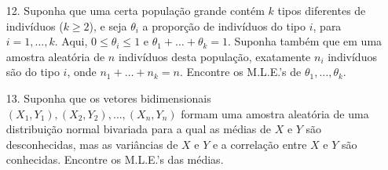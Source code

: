 \begin{enumerate}
    \item[12.] Suponha que uma certa população grande contém $k$ tipos diferentes de indivíduos ($k \ge 2$), e seja $\theta_i$ a proporção de indivíduos do tipo $i$, para $i=1, \dots, k$. Aqui, $0 \le \theta_i \le 1$ e $\theta_1 + \dots + \theta_k = 1$. Suponha também que em uma amostra aleatória de $n$ indivíduos desta população, exatamente $n_i$ indivíduos são do tipo $i$, onde $n_1 + \dots + n_k = n$. Encontre os M.L.E.'s de $\theta_1, \dots, \theta_k$.

    \item[13.] Suponha que os vetores bidimensionais $(X_1, Y_1), (X_2, Y_2), \dots, (X_n, Y_n)$ formam uma amostra aleatória de uma distribuição normal bivariada para a qual as médias de $X$ e $Y$ são desconhecidas, mas as variâncias de $X$ e $Y$ e a correlação entre $X$ e $Y$ são conhecidas. Encontre os M.L.E.'s das médias.
\end{enumerate}